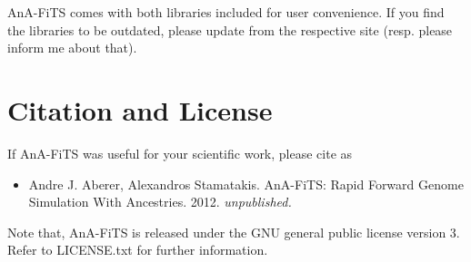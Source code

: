 \documentclass{scrartcl}
\begin{document}
AnA-FiTS comes with both libraries included for user convenience. If
you find the libraries to be outdated, please update from the
respective site (resp. please inform me about that).

\section{Citation and License }
\label{sec:citation}

If AnA-FiTS was useful for your scientific work, please cite as 

\begin{itemize}
\item Andre J. Aberer, Alexandros Stamatakis. AnA-FiTS: Rapid Forward
  Genome Simulation With Ancestries. 2012. \textit{unpublished.}
\end{itemize}


\noindent Note that, AnA-FiTS is released under the GNU general public
license version 3. Refer to LICENSE.txt for further information. 
\end{document}
